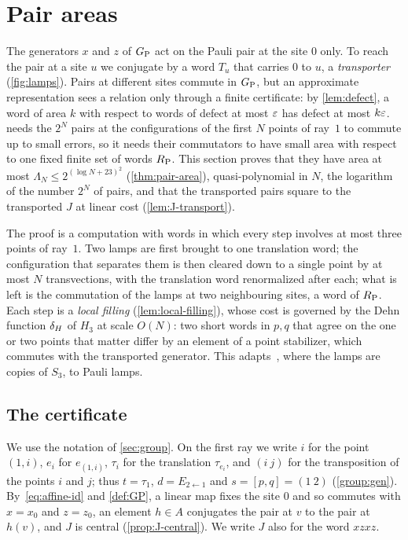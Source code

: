 \section{Pair areas}\label{sec:pair}

The generators $x$ and $z$ of $G_{\mathrm P}$ act on the Pauli pair at the site $0$ only. To reach the pair at a site $u$ we conjugate by a word
$T_u$ that carries $0$ to $u$, a \emph{transporter} (\cref{fig:lamps}). Pairs at different sites commute in $G_{\mathrm P}$, but an approximate
representation sees a relation only through a finite certificate: by \cref{lem:defect}, a word of area $k$ with respect to words of
defect at most $\varepsilon$ has defect at most $k\varepsilon$.  needs the $2^N$ pairs at the configurations of the first $N$ points of
ray~$1$ to commute up to small errors, so it needs their commutators to have small area with respect to one fixed finite set of words
$R_{\mathrm P}$. This section proves that they have area at most $\Lambda_N\le2^{(\log N+23)^2}$ (\cref{thm:pair-area}), quasi-polynomial in $N$,
the logarithm of the number $2^N$ of pairs, and that the transported pairs square to the transported $J$ at linear cost (\cref{lem:J-transport}).

The proof is a computation with words in which every step involves at most three points of ray~$1$. Two lamps are first brought to
one translation word; the configuration that separates them is then cleared down to a single point by at most $N$ transvections, with the
translation word renormalized after each; what is left is the commutation of the lamps at two neighbouring sites, a word of $R_{\mathrm P}$. Each
step is a \emph{local filling} (\cref{lem:local-filling}), whose cost is governed by the Dehn function $\delta_{H}$ of $H_3$ at scale $O(N)$: two
short words in $p,q$ that agree on the one or two points that matter differ by an element of a point stabilizer, which commutes with the
transported generator. This adapts~\cite[Theorem~5.1]{DM-lamps}, where the lamps are copies of $S_3$, to Pauli lamps.

\subsection{The certificate}\label{sec:pair-cert}

We use the notation of \cref{sec:group}. On the first ray we write $i$ for the point $(1,i)$, $e_i$ for $e_{(1,i)}$, $\tau_i$ for the
translation $\tau_{e_i}$, and $(i\ j)$ for the transposition of the points $i$ and $j$; thus $t=\tau_1$, $d=E_{2\leftarrow1}$ and
$s=[p,q]=(1\ 2)$ (\cref{group:gen}). By~\eqref{eq:affine-id} and \cref{def:GP}, a linear map fixes the site $0$ and so commutes with $x=x_0$
and $z=z_0$, an element $h\in A$ conjugates the pair at $v$ to the pair at $h(v)$, and $J$ is central (\cref{prop:J-central}). We write $J$
also for the word $xzxz$.

